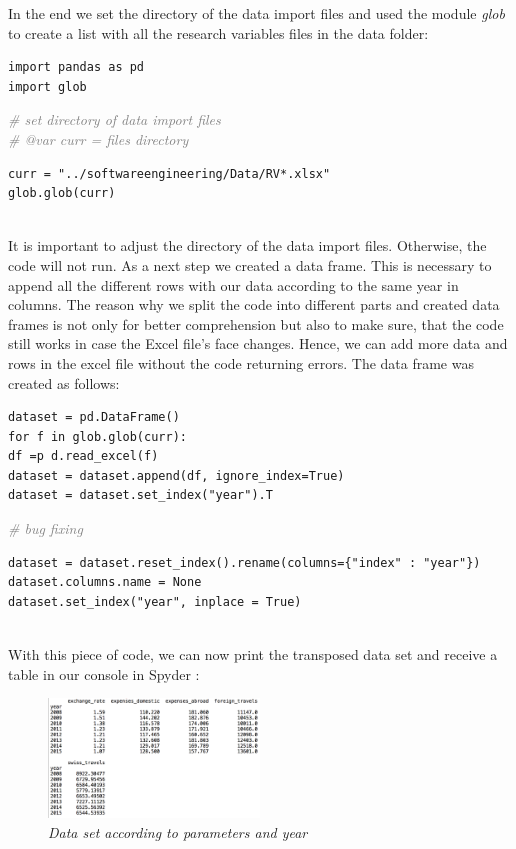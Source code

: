 \documentclass[12pt,a4paper,bibliography=totocnumbered,listof=totocnumbered]{scrartcl}
\begin{document}
In the end we set the directory of the data import files and used the module \textit{glob} to create a list with all the research variables files in the data folder:
\ \\
\begin{verbatim}
import pandas as pd
import glob
\end{verbatim}
\textcolor{gray}{\textit{\# set directory of data import files}}\\ 
\textcolor{gray}{\textit{\# @var curr = files directory}}
\begin{verbatim}
curr = "../softwareengineering/Data/RV*.xlsx"
glob.glob(curr)
\end{verbatim}
\ \\
It is important to adjust the directory of the data import files. Otherwise, the code will not run. As a next step we created a data frame. This is necessary to append all the different rows with our data according to the same year in columns. The reason why we split the code into different parts and created data frames is not only for better comprehension but also to make sure, that the code still works in case the Excel file's face changes. Hence, we can add more data and rows in the excel file without the code returning errors. The data frame was created as follows:
\ \\
\begin{verbatim}
dataset = pd.DataFrame()
for f in glob.glob(curr):
df =p d.read_excel(f)
dataset = dataset.append(df, ignore_index=True)
dataset = dataset.set_index("year").T
\end{verbatim}
\textcolor{gray}{\textit{\# bug fixing}}
\begin{verbatim}
dataset = dataset.reset_index().rename(columns={"index" : "year"})
dataset.columns.name = None
dataset.set_index("year", inplace = True)
\end{verbatim}
\ \\
With this piece of code, we can now print the transposed data set and receive a table in our console in Spyder :

\begin{figure}[htbp] 
  \centering
     \includegraphics[width=0.5\textwidth]{data_table}
  \caption{\textit{Data set according to parameters and year}}
  \label{fig: figure2}
\end{figure}
\end{document}
